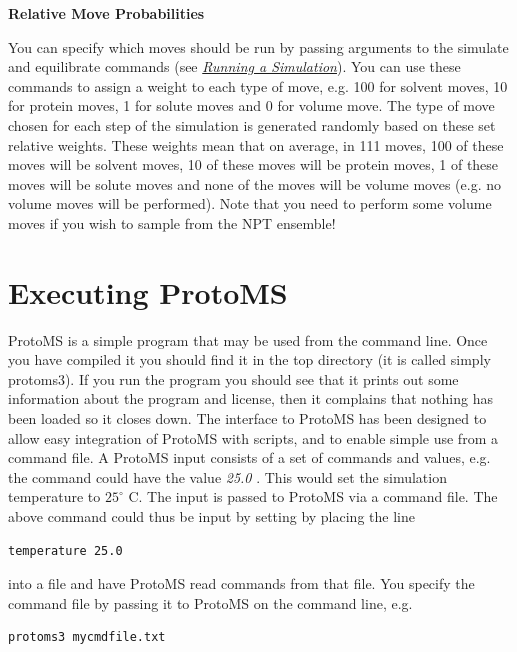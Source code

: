\documentclass[letterpaper,10pt,english]{sphinxmanual}
\begin{document}
\textbf{Relative Move Probabilities}

You can specify which moves should be run by passing arguments to the simulate and equilibrate commands (see {\hyperref[protoms:runcmd]{\emph{Running a Simulation}}}). You can use these commands to assign a weight to each type of move, e.g. 100 for solvent moves, 10 for protein moves, 1 for solute moves and 0 for volume move. The type of move chosen for each step of the simulation is generated randomly based on these set relative weights. These weights mean that on average, in 111 moves, 100 of these moves will be solvent moves, 10 of these moves will be protein moves, 1 of these moves will be solute moves and none of the moves will be volume moves (e.g. no volume moves will be performed). Note that you need to perform some volume moves if you wish to sample from the NPT ensemble!


\chapter{Executing ProtoMS}
\label{protoms:executing-protoms}
ProtoMS is a simple program that may be used from the command line. Once you have compiled it you should find it in the top directory (it is called simply protoms3). If you run the program you should see that it prints out some information about the program and license, then it complains that nothing has been loaded so it closes down. The interface to ProtoMS has been designed to allow easy integration of ProtoMS with scripts, and to enable simple use from a command file. A ProtoMS input consists of a set of commands and values, e.g. the command  could have the value \emph{25.0} . This would set the simulation temperature to \(25^\circ\) C. The input is passed to ProtoMS via a command file. The above command could thus be input by setting by placing the line

\begin{Verbatim}[frame=single,commandchars=\\\{\}]
temperature 25.0
\end{Verbatim}

into a file and have ProtoMS read commands from that file. You specify the command file by passing it to ProtoMS on the command line, e.g.

\begin{Verbatim}[frame=single,commandchars=\\\{\}]
protoms3 mycmdfile.txt
\end{Verbatim}
\end{document}
